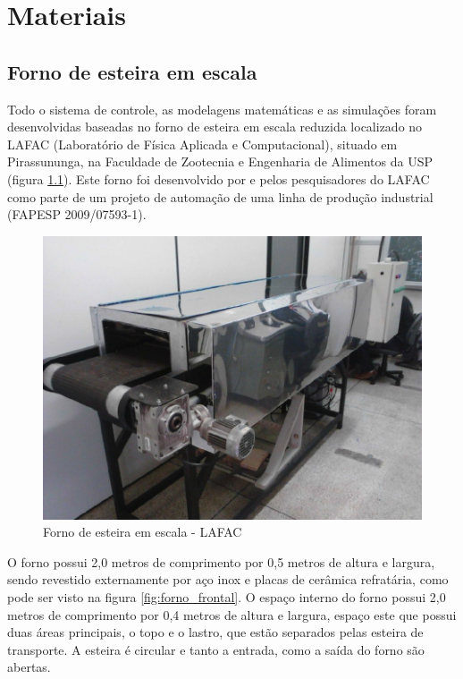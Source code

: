\chapter{Materiais}\label{materiais}

\section{Forno de esteira em escala}\label{modelo-do-forno}

Todo o sistema de controle, as modelagens matemáticas e  as simulações foram desenvolvidas baseadas no forno de esteira em escala reduzida localizado no LAFAC (Laboratório de Física Aplicada e Computacional), situado em Pirassununga, na Faculdade de Zootecnia e Engenharia de Alimentos da USP (figura \ref{fig:forno_real}). Este forno foi desenvolvido por \citet{arthur} e pelos pesquisadores do LAFAC como parte de um projeto de automação de uma linha de produção industrial (FAPESP 2009/07593-1).

\begin{figure}[H]
\centering
\includegraphics[width=\textwidth]{Figuras/forno_real}
\caption{Forno de esteira em escala - LAFAC}
\label{fig:forno_real}
\end{figure}

O forno possui 2,0 metros de comprimento por 0,5 metros de altura e largura, sendo revestido externamente por aço inox e placas de cerâmica refratária, como pode ser visto na figura \ref{fig:forno_frontal}. O espaço interno do forno possui  2,0 metros de comprimento por 0,4 metros de altura e largura, espaço este que possui duas áreas principais, o topo e o lastro, que estão separados pelas esteira de transporte. A esteira é circular e tanto a entrada, como a saída do forno são abertas.


